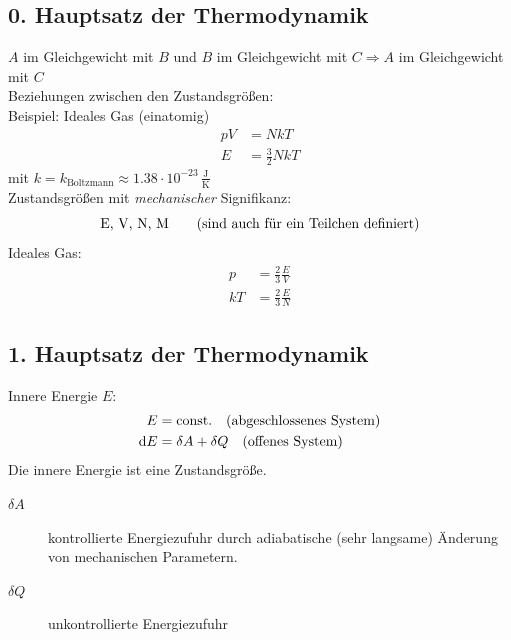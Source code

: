 \subsection{0. Hauptsatz der Thermodynamik}
$A$ im Gleichgewicht mit $B$ und $B$ im Gleichgewicht mit $C \Rightarrow A$ im Gleichgewicht mit $C$ \\
Beziehungen zwischen den Zustandsgrößen: \\
Beispiel: Ideales Gas (einatomig)
\begin{equation}
    \begin{split}
        p V &= N k T \\
        E &= \frac{3}{2} N k T
    \end{split}
\end{equation}
mit $k=k_\text{Boltzmann} \approx 1.38\cdot 10^{-23}\,\frac{\text{J}}{\text{K}}$ \\
Zustandsgrößen mit \emph{mechanischer} Signifikanz:
\begin{equation}
    $E, V, N, M$ \qquad \text{(sind auch für ein Teilchen definiert)}
\end{equation}
Ideales Gas:
\begin{equation}
    \begin{split}
        p &= \frac{2}{3} \frac{E}{V} \\
        k T &= \frac{2}{3} \frac{E}{N}
    \end{split}
\end{equation}
\subsection{1. Hauptsatz der Thermodynamik}
Innere Energie $E$:
\begin{equation}
    \begin{split}
        E&=\text{const.} \quad \text{(abgeschlossenes System)} \\
        \mathrm{d} E &= \delta A + \delta Q \quad \text{(offenes System)}
    \end{split}
\end{equation}
Die innere Energie ist eine Zustandsgröße.
\begin{description}
    \item[$\delta A$] kontrollierte Energiezufuhr durch adiabatische (sehr langsame) Änderung von mechanischen Parametern.
    \item[$\delta Q$] unkontrollierte Energiezufuhr
\end{description}
